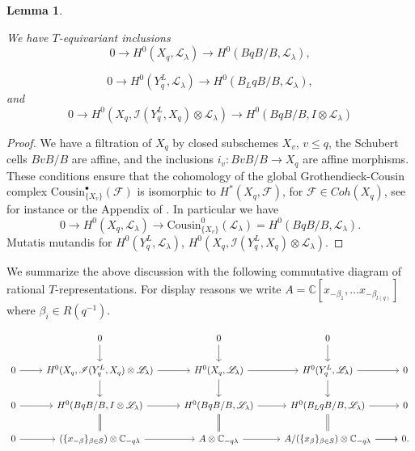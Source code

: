 \documentclass[12pt,reqno]{amsart}
\newtheorem{lemma}[theorem]{Lemma}
\theoremstyle{definition}
\begin{document}
\begin{lemma} \label{OpenCellRestriction}

We have $T$-equivariant inclusions
 \[0 \rightarrow H^0(X_q, \mathscr{L}_{\lambda}) \rightarrow H^0(BqB/B, \mathscr{L}_{\lambda}),\] 

  \[0 \rightarrow H^0(Y_q^{L}, \mathscr{L}_{\lambda}) \rightarrow H^0(B_LqB/B, \mathscr{L}_{\lambda}),\]
  and 
  \[0 \rightarrow H^0(X_q, \mathscr{I}(Y_q^L, X_q) \otimes \mathscr{L}_{\lambda}) \rightarrow H^0(BqB/B, I \otimes \mathscr{L}_{\lambda} )\]
\end{lemma}
\begin{proof}
We have a filtration of $X_q$ by closed subschemes $X_v$, $v \leq q$, the Schubert cells $BvB/B$ are affine, and the inclusions $i_v: BvB/B \rightarrow X_q$ are affine morphisms. These conditions ensure that the cohomology of the global Grothendieck-Cousin complex $\mathrm{Cousin}^{\bullet}_{\{X_v\}}(\mathscr{F})$ is isomorphic to $H^*(X_q, \mathscr{F})$, for $\mathscr{F} \in Coh(X_q)$, see for instance \cite{Kempf} or the Appendix of \cite{KumarBook}. In particular we have \[0 \rightarrow H^0(X_q, \mathscr{L}_{\lambda}) \rightarrow \mathrm{Cousin}_{\{X_v\}}^{0}(\mathscr{L}_{\lambda})=H^0(BqB/B, \mathscr{L}_{\lambda}).\] Mutatis mutandis for $H^0(Y_q^{L}, \mathscr{L}_{\lambda})$, $H^0(X_q, \mathscr{I}(Y_q^L, X_q) \otimes \mathscr{L}_{\lambda})$. 
\end{proof}


We summarize the above discussion with the following commutative diagram of rational $T$-representations. For display reasons we write $A= \mathbb{C}[x_{-\beta_1}, \dots x_{-\beta_{l(q)}}]$ where $\beta_i \in R(q^{-1})$.



\begin{equation} \label{idealses}
\begin{tikzcd}
& 0 \arrow[d] &0 \arrow[d] &0 \arrow[d] & \\
0 \arrow[r] &  H^0(X_q,\mathscr{I}(Y_q^L, X_q) \otimes \mathscr{L}_{\lambda}) \arrow[r] \arrow[d] &H^0(X_q, \mathscr{L}_{\lambda})\arrow[r] \arrow[d] & H^0(Y_q^L, \mathscr{L}_{\lambda}) \arrow[d] \arrow[r]& 0\\
 0 \arrow[r]& H^0(BqB/B, I \otimes \mathscr{L}_{\lambda}) \arrow[r] \arrow[d, equals] & H^0(BqB/B, \mathscr{L}_{\lambda}) \arrow[r] \arrow[d, equals] & H^0(B_LqB/B, \mathscr{L}_{\lambda}) \arrow[r] \arrow[d, equals] & 0 \\
 0 \arrow[r] & (\{x_{-\beta}\}_{\beta \in S}) \otimes \mathbb{C}_{-q \lambda} \arrow[r] & A \otimes \mathbb{C}_{-q \lambda} \arrow[r] & \arrow[r] A/(\{x_{\beta}\}_{\beta \in S}) \otimes \mathbb{C}_{-q \lambda} \arrow[r] & 0.\\ 
\end{tikzcd}
\end{equation}
\end{document}
